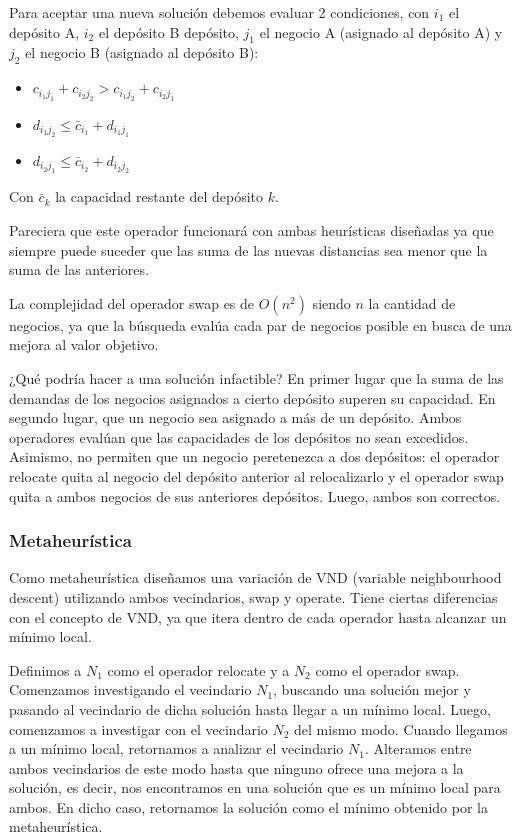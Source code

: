 \documentclass[
]{article}
\begin{document}
Para aceptar una nueva solución debemos evaluar 2 condiciones, con
\(i_1\) el depósito A, \(i_2\) el depósito B depósito, \(j_1\) el
negocio A (asignado al depósito A) y \(j_2\) el negocio B (asignado al
depósito B):

\begin{itemize}
\item
  \(c_{i_1j_1} + c_{i_2j_2} > c_{i_1j_2} + c_{i_2j_1}\)
\item
  \(d_{i_1j_2} \leq \bar{c}_{i_1} + d_{i_1j_1}\)
\item
  \(d_{i_2j_1} \leq \bar{c}_{i_2}+d_{i_2j_2}\)
\end{itemize}

Con \(\bar{c}_k\) la capacidad restante del depósito \(k\).

Pareciera que este operador funcionará con ambas heurísticas diseñadas
ya que siempre puede suceder que las suma de las nuevas distancias sea
menor que la suma de las anteriores.

La complejidad del operador swap es de \(O(n^2)\) siendo \(n\) la
cantidad de negocios, ya que la búsqueda evalúa cada par de negocios
posible en busca de una mejora al valor objetivo.

¿Qué podría hacer a una solución infactible? En primer lugar que la suma
de las demandas de los negocios asignados a cierto depósito superen su
capacidad. En segundo lugar, que un negocio sea asignado a más de un
depósito. Ambos operadores evalúan que las capacidades de los depósitos
no sean excedidos. Asimismo, no permiten que un negocio peretenezca a
dos depósitos: el operador relocate quita al negocio del depósito
anterior al relocalizarlo y el operador swap quita a ambos negocios de
sus anteriores depósitos. Luego, ambos son correctos.

\hypertarget{metaheuruxedstica}{%
\subsubsection{Metaheurística}\label{metaheuruxedstica}}

Como metaheurística diseñamos una variación de VND (variable
neighbourhood descent) utilizando ambos vecindarios, swap y operate.
Tiene ciertas diferencias con el concepto de VND, ya que itera dentro de
cada operador hasta alcanzar un mínimo local.

Definimos a \(N_1\) como el operador relocate y a \(N_2\) como el
operador swap. Comenzamos investigando el vecindario \(N_1\), buscando
una solución mejor y pasando al vecindario de dicha solución hasta
llegar a un mínimo local. Luego, comenzamos a investigar con el
vecindario \(N_2\) del mismo modo. Cuando llegamos a un mínimo local,
retornamos a analizar el vecindario \(N_1\). Alteramos entre ambos
vecindarios de este modo hasta que ninguno ofrece una mejora a la
solución, es decir, nos encontramos en una solución que es un mínimo
local para ambos. En dicho caso, retornamos la solución como el mínimo
obtenido por la metaheurística.
\end{document}
